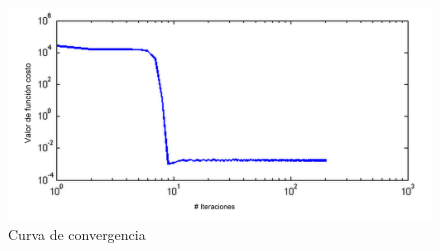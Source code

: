 \begin{figure}[H]
\centering
\includegraphics[scale=0.07]{images/grafico_costo_con_carteles.jpg}
\caption{Curva de convergencia}
\label{fig:convergencia}
\end{figure}
